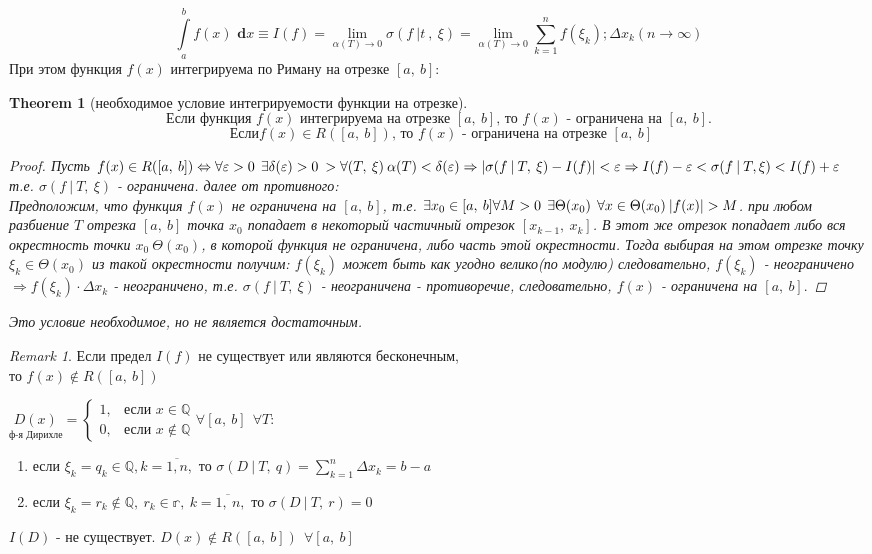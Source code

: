 \documentclass[a4paper,12pt]{bookest}
\newtheorem{theorem}{Theorem}[section]
\theoremstyle{remark}
\newtheorem*{remark}{Remark}
\newcommand\dx{\textbf{ d}x}
\begin{document}
$$\int\limits_a^b f(x)\dx\equiv I(f)=\lim_{\alpha(T)\to0}\sigma(f\>|t\>,\>\xi)=\lim_{\alpha(T)\to0}\sum\limits_{k=1}^n f(\xi_k);\Delta x_k(n\to\infty)$$
При этом функция $f(x)$ интегрируема по Риману на отрезке $[a,\>b]:$
\begin{theorem}[необходимое условие интегрируемости функции на отрезке]
	$$\textrm{Если функция }f(x)\textrm{ интегрируема на отрезке }[a,\>b]\textrm{, то }f(x)\textrm{ - ограничена на }[a,\>b].$$
	$$\textrm{ Если}f(x)\in R([a,\>b])\textrm{, то }f(x)\textrm{ - ограничена на отрезке }[a,\>b]$$
	\begin{proof}
		Пусть $f(x)\in R([a,\>b])\Leftrightarrow\forall\varepsilon>0\>\>\exists\delta(\varepsilon)>0\>>\forall (T,\>\xi)\>\alpha (T)<\delta(\varepsilon)\Rightarrow|\sigma(f\>|\>T,\>\xi)-I(f)|<\varepsilon\Rightarrow I(f)-\varepsilon <\sigma(f\>|\>T,\xi)<I(f)+\varepsilon \\$ т.е. $\sigma(f\>|\>T,\>\xi)$ - ограничена. далее от противного: \\ Предположим, что функция $f(x)$ не ограничена на $[a,\>b]$, т.е. $\exists x_0\in[a,\>b]\\\forall M>0\>\>\exists\Theta(x_0)\>\>\forall x\in\Theta(x_0)\>|f(x)|>M$. при любом разбиение $T$ отрезка $[a,\>b]$ точка $x_0$ попадает в некоторый частичный отрезок $[x_{k-1},\>x_k]$. В этот же отрезок попадает либо вся окрестность точки $x_0\>\Theta(x_0)$, в которой функция не ограничена, либо часть этой окрестности. Тогда выбирая на этом отрезке точку $\xi_k\in\Theta(x_0)$  из такой окрестности получим: $f(\xi_k)$ может быть как угодно велико(по модулю) следовательно, $f(\xi_k)$ - неограничено $\Rightarrow f(\xi_k)\cdot\Delta x_k$ - неограничено, т.е. $\sigma(f\>|\>T,\>\xi)$ - неограничена - противоречие, следовательно, $f(x)$ - ограничена на $[a,\>b].$
	\end{proof}
	Это условие необходимое, но не является достаточным.
\end{theorem}
\begin{remark}
	Если предел $I(f)$ не существует или являются бесконечным, \\то $f(x)\not\in R([a,\>b])$
\end{remark}
\begin{example}
	$\underset{\textrm{ф-я Дирихле}}{D(x)}=\left\{\begin{array}{rl}
		1, & \textrm{если } x\in\mathbb{Q}\\
		0, & \textrm{если } x\not\in\mathbb{Q}
	\end{array}\right.$\newpage $\forall [a,\>b]\>\>\forall T:$\begin{enumerate}
		\item если $\xi_k=q_k\in\mathbb{Q},k=\overline{1,n},$ то $\sigma(D\>|\>T,\>q)=\sum\limits_{k=1}^n\Delta x_k=b-a$
		\item если $\xi_k=r_k\not\in\mathbb{Q},\>r_k\in\mathbb{r},\>k=\overline{1,\>n},$ то $\sigma(D\>|\>T,\>r)=0$
	\end{enumerate}
	$I(D)$ - не существует. $D(x)\not\in R([a,\>b])\>\>\forall [a,\>b]$
\end{example}
\end{document}
